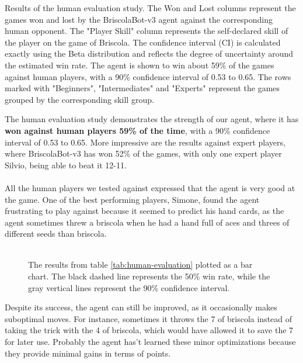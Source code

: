 \begin{table}[H]
    \caption{Results of the human evaluation study. The Won and Lost columns represent the games won and lost by the BriscolaBot-v3 agent against the corresponding human opponent. The "Player Skill" column represents the self-declared skill of the player on the game of Briscola. The confidence interval (CI) is calculated exactly using the Beta distribution and reflects the degree of uncertainty around the estimated win rate. The agent is shown to win about 59\% of the games against human players, with a 90\% confidence interval of 0.53 to 0.65. The rows marked with "Beginners", "Intermediates" and "Experts" represent the games grouped by the corresponding skill group.}
    \label{tab:human-evaluation}
\end{table}

The human evaluation study demonstrates the strength of our agent, where it has \textbf{won against human players 59\% of the time}, with a 90\% confidence interval of 0.53 to 0.65. More impressive are the results against expert players, where BriscolaBot-v3 has won 52\% of the games, with only one expert player Silvio, being able to beat it 12-11.\\\\
All the human players we tested against expressed that the agent is very good at the game. One of the best performing players, Simone, found the agent frustrating to play against because it seemed to predict his hand cards, as the agent sometimes threw a briscola when he had a hand full of aces and threes of different seeds than briscola.\\\\

\begin{figure}[H]
    
    \caption{The results from table \ref{tab:human-evaluation} plotted as a bar chart. The black dashed line represents the 50\% win rate, while the gray vertical lines represent the 90\% confidence interval.}
    \label{fig:player-scores}
\end{figure}


Despite its success, the agent can still be improved, as it occasionally makes suboptimal moves. For instance, sometimes it throws the 7 of briscola instead of taking the trick with the 4 of briscola, which would have allowed it to save the 7 for later use. Probably the agent has't learned these minor optimizations because they provide minimal gains in terms of points.
